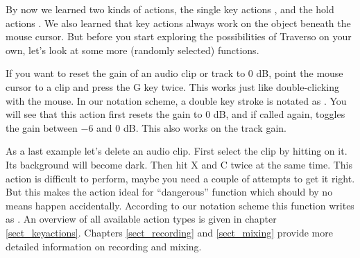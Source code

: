 By now we learned two kinds of actions, the single key actions , and the hold actions . We also learned that key actions always work on the object beneath the mouse cursor. But before you start exploring the possibilities of Traverso on your own, let's look at some more (randomly selected) functions.

If you want to reset the gain of an audio clip or track to 0 dB, point the mouse cursor to a clip and press the G key twice. This works just like double-clicking with the mouse. In our notation scheme, a double key stroke is notated as . You will see that this action first resets the gain to 0 dB, and if called again, toggles the gain between $-6$ and 0 dB. This also works on the track gain.

As a last example let's delete an audio clip. First select the clip by hitting  on it. Its background will become dark. Then hit X and C twice at the same time. This action is difficult to perform, maybe you need a couple of attempts to get it right. But this makes the action ideal for ``dangerous'' function which should by no means happen accidentally. According to our notation scheme this function writes as . An overview of all available action types is given in chapter \ref{sect_keyactions}. Chapters \ref{sect_recording} and \ref{sect_mixing} provide more detailed information on recording and mixing.


